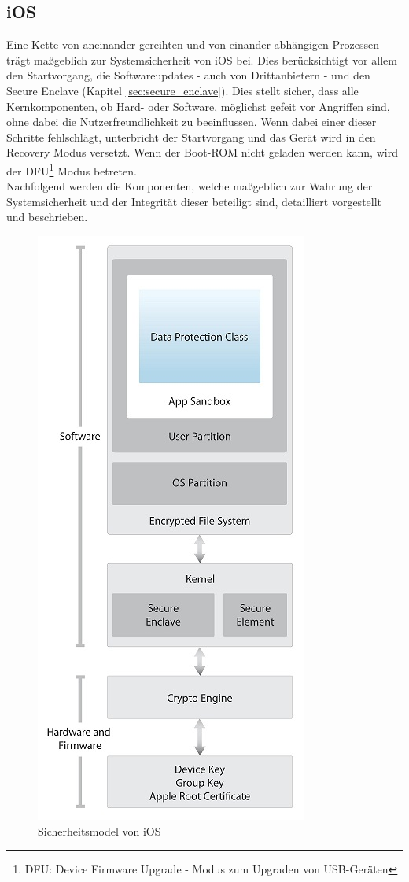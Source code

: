 \subsection{iOS}\label{sec:components-syssec} 
	Eine Kette von aneinander gereihten und von einander abhängigen Prozessen trägt
	maßgeblich zur Systemsicherheit von iOS bei. Dies berücksichtigt vor allem den
	Startvorgang, die Softwareupdates - auch von Drittanbietern - und den Secure
	Enclave (Kapitel \ref{sec:secure_enclave}). Dies stellt sicher, dass
	alle Kernkomponenten, ob Hard- oder Software, möglichst gefeit vor Angriffen sind,
	ohne dabei die Nutzerfreundlichkeit zu beeinflussen. Wenn dabei einer dieser
	Schritte fehlschlägt, unterbricht der Startvorgang und das Gerät wird in den
	Recovery Modus versetzt. Wenn der Boot-ROM nicht geladen werden kann, wird der
	DFU\footnote{DFU: Device Firmware Upgrade - Modus zum Upgraden von USB-Geräten}
	Modus betreten.\\
	Nachfolgend werden die Komponenten, welche maßgeblich zur Wahrung der
	Systemsicherheit und der Integrität dieser beteiligt sind, detailliert
	vorgestellt und beschrieben.
	
	\begin{figure}[h]
		\centering
		\includegraphics[width=0.4\linewidth]{ios/media/security-model.jpg}
		\caption{Sicherheitsmodel von iOS 
		\cite[S. 4]{iOSSecurityApr2015}}
		\label{fig:security-model}
	\end{figure}

